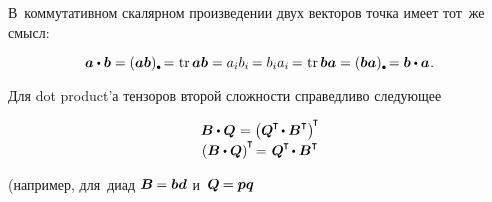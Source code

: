 \begin{otherlanguage}{russian}
В~коммутативном скалярном произведении двух векторов точка имеет тот~же смысл:

\nopagebreak\vspace{-0.2em}\begin{equation}
\bm{a} \dotp \bm{b}
= ( \bm{a} \bm{b} )\hspace{.1ex}\tracedot \hspace{-0.1ex}
= \hspace{.1ex} \operatorname{tr} \bm{a}\bm{b}
= a_i b_i \hspace{-0.2ex}
= b_i a_i \hspace{-0.2ex}
= \hspace{.1ex} \operatorname{tr} \bm{b}\bm{a}
= ( \bm{b} \bm{a} )\hspace{.1ex}\tracedot \hspace{-0.1ex}
= \bm{b} \dotp \bm{a}
\hspace{.1ex} .
\end{equation}

Для dot product’а тензоров второй сложности справедливо следующее

\nopagebreak\vspace{-0.8em}\begin{equation}\label{transposeofdotproduct}
\begin{array}{c}
\bm{B} \dotp \bm{Q} \hspace{.1ex} = \left({ \bm{Q}^{\hspace{-0.1ex}\T} \hspace{-0.2ex}\dotp \bm{B}^{\T} }\right)^{\hspace{-0.25ex}\T}
\\[.1em]
\left({ \bm{B} \dotp \bm{Q}}\right)^{\hspace{-0.1ex}\T} \hspace{-0.3ex} = \hspace{.2ex} \bm{Q}^{\hspace{-0.1ex}\T} \hspace{-0.2ex}\dotp \bm{B}^{\T}
\end{array}
\end{equation}

\vspace{-0.1em} \noindent (\hspace{.25ex}например, для~диад ${\bm{B} \hspace{-0.1ex} = \bm{b}\bm{d}}$ и~${\bm{Q} \hspace{-0.1ex} = \bm{p}\bm{q}}$


\end{otherlanguage}
